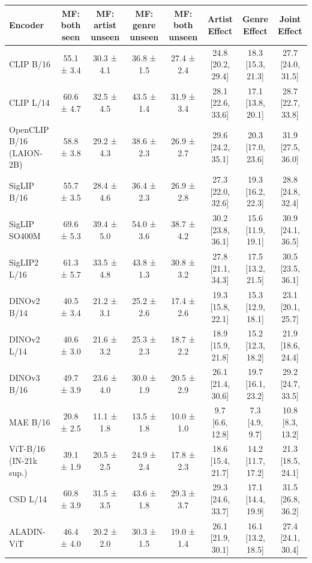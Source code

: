 \begin{tabular}{lccccccc}
\toprule
Encoder & MF: both seen & MF: artist unseen & MF: genre unseen & MF: both unseen & Artist Effect & Genre Effect & Joint Effect \\
\midrule
CLIP B/16 & 55.1 ± 3.4 & 30.3 ± 4.1 & 36.8 ± 1.5 & 27.4 ± 2.4 & 24.8 [20.2, 29.4] & 18.3 [15.3, 21.3] & 27.7 [24.0, 31.5] \\
CLIP L/14 & 60.6 ± 4.7 & 32.5 ± 4.5 & 43.5 ± 1.4 & 31.9 ± 3.4 & 28.1 [22.6, 33.6] & 17.1 [13.8, 20.1] & 28.7 [22.7, 33.8] \\
OpenCLIP B/16 (LAION-2B) & 58.8 ± 3.8 & 29.2 ± 4.3 & 38.6 ± 2.3 & 26.9 ± 2.7 & 29.6 [24.2, 35.1] & 20.3 [17.0, 23.6] & 31.9 [27.5, 36.0] \\
SigLIP B/16 & 55.7 ± 3.5 & 28.4 ± 4.6 & 36.4 ± 2.3 & 26.9 ± 2.8 & 27.3 [22.0, 32.6] & 19.3 [16.2, 22.3] & 28.8 [24.8, 32.4] \\
SigLIP SO400M & 69.6 ± 5.3 & 39.4 ± 5.0 & 54.0 ± 3.6 & 38.7 ± 4.2 & 30.2 [23.8, 36.1] & 15.6 [11.9, 19.1] & 30.9 [24.1, 36.5] \\
SigLIP2 L/16 & 61.3 ± 5.7 & 33.5 ± 4.8 & 43.8 ± 1.3 & 30.8 ± 3.2 & 27.8 [21.1, 34.3] & 17.5 [13.2, 21.5] & 30.5 [23.5, 36.1] \\
DINOv2 B/14 & 40.5 ± 3.4 & 21.2 ± 3.1 & 25.2 ± 2.6 & 17.4 ± 2.6 & 19.3 [15.8, 22.1] & 15.3 [12.9, 18.1] & 23.1 [20.1, 25.7] \\
DINOv2 L/14 & 40.6 ± 3.0 & 21.6 ± 3.2 & 25.3 ± 2.3 & 18.7 ± 2.2 & 18.9 [15.9, 21.8] & 15.2 [12.3, 18.2] & 21.9 [18.6, 24.4] \\
DINOv3 B/16 & 49.7 ± 3.9 & 23.6 ± 4.0 & 30.0 ± 1.9 & 20.5 ± 2.9 & 26.1 [21.4, 30.6] & 19.7 [16.1, 23.2] & 29.2 [24.7, 33.5] \\
MAE B/16 & 20.8 ± 2.5 & 11.1 ± 1.8 & 13.5 ± 1.8 & 10.0 ± 1.0 & 9.7 [6.6, 12.8] & 7.3 [4.9, 9.7] & 10.8 [8.3, 13.2] \\
ViT-B/16 (IN-21k sup.) & 39.1 ± 1.9 & 20.5 ± 2.5 & 24.9 ± 2.4 & 17.8 ± 2.3 & 18.6 [15.4, 21.7] & 14.2 [11.7, 17.2] & 21.3 [18.5, 24.1] \\
CSD L/14 & 60.8 ± 3.9 & 31.5 ± 3.5 & 43.6 ± 1.8 & 29.3 ± 3.7 & 29.3 [24.6, 33.7] & 17.1 [14.4, 19.9] & 31.5 [26.8, 36.2] \\
ALADIN-ViT & 46.4 ± 4.0 & 20.2 ± 2.0 & 30.3 ± 1.5 & 19.0 ± 1.4 & 26.1 [21.9, 30.1] & 16.1 [13.2, 18.5] & 27.4 [24.1, 30.4] \\
\bottomrule
\end{tabular}

